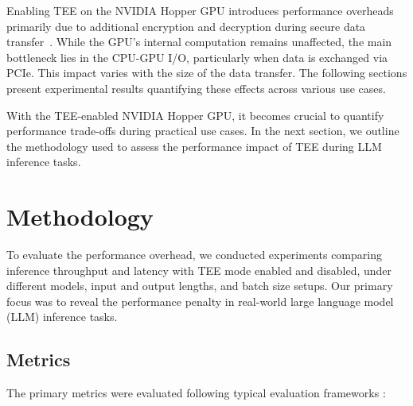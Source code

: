 \documentclass{article}
\begin{document}
Enabling TEE on the NVIDIA Hopper GPU introduces performance overheads primarily due to additional encryption and decryption during secure data transfer~\cite{mohan2024securing}. While the GPU’s internal computation remains unaffected, the main bottleneck lies in the CPU-GPU I/O, particularly when data is exchanged via PCIe. This impact varies with the size of the data transfer. The following sections present experimental results quantifying these effects across various use cases.

With the TEE-enabled NVIDIA Hopper GPU, it becomes crucial to quantify performance trade-offs during practical use cases. In the next section, we outline the methodology used to assess the performance impact of TEE during LLM inference tasks.

\section{Methodology}

To evaluate the performance overhead, we conducted experiments comparing inference throughput and latency with TEE mode enabled and disabled, under different models, input and output lengths, and batch size setups. Our primary focus was to reveal the performance penalty in real-world large language model (LLM) inference tasks.

\subsection{Metrics}

The primary metrics were evaluated following typical evaluation frameworks \cite{agrawal2024metron}:
\end{document}
